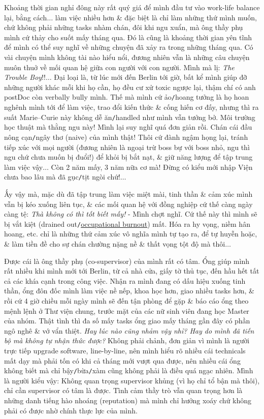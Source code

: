 \documentclass[12pt,oneside]{book}
\begin{document}
Khoảng thời gian nghỉ đông này rất quý giá để mình đầu tư vào work-life balance lại, bằng cách$\ldots$ làm việc nhiều hơn \& đặc biệt là chỉ làm những thứ mình muốn, chứ không phải những tasks nhàm chán, đôi khi ngu xuẩn, mà ông thầy phụ mình cứ thảy cho suốt mấy tháng qua. Đó là cũng là khoảng thời gian yên tĩnh để mình có thể suy nghĩ về những chuyện đã xảy ra trong những tháng qua. Có vài chuyện mình không tài nào hiểu nổi, đương nhiên vẫn là những câu chuyện muôn thuở về mối quan hệ giữa con người với con người. Mình mà lị: {\it The Trouble Boy}!!$\ldots$ Đại loại là, từ lúc mới đến Berlin tới giờ, bất kể mình giúp đỡ những người khác mỗi khi họ cần, họ đều cư xử toxic ngược lại, thậm chí có anh postDoc còn verbally bully mình. Thế mà mình cứ ảo{\tt/}hoang tưởng là họ hoan nghênh mình tới để làm việc, trao đổi kiến thức \& cống hiến cơ đấy, nhưng thì ra suất Marie--Curie này không dễ ăn{\tt/}handled như mình vẫn tưởng bở. Môi trường học thuật mà thằng ngu này! Mình lại suy nghĩ quá đơn giản rồi. Chán cái đầu nông cạn{\tt/}ngây thơ (naive) của mình thật! Thôi cứ đành ngậm họng lại, tránh tiếp xúc với mọi người (đương nhiên là ngoại trừ boss bự với boss nhỏ, ngu thì ngu chứ chưa muốn bị đuổi!) để khỏi bị bắt nạt, \& giữ năng lượng để tập trung làm việc vậy$\ldots$ Còn 2 năm mấy, 3 năm nữa cơ mà! Đừng có kiểu mới nhập Viện chưa bao lâu mà đã gục{\tt/}tịt ngòi chứ!$\ldots$

Ấy vậy mà, mặc dù đã tập trung làm việc miệt mài, tinh thần \& cảm xúc mình vẫn bị kéo xuống liên tục, \& các mối quan hệ với đồng nghiệp cứ thế càng ngày càng tệ: {\it Thà không có thì tốt biết mấy!} - Mình chợt nghĩ. Cứ thế này thì mình sẽ bị vắt kiệt (drained out{\tt/}\href{https://en.wikipedia.org/wiki/Occupational_burnout}{occupational burnout}) mất. Hóa ra hy vọng, niềm hân hoang, etc. chỉ là những thứ cảm xúc vô nghĩa mình tự tạo ra, để tự huyễn hoặc, \& làm tiền đề cho sự chán chường nặng nề \& thất vọng tột độ mà thôi$\ldots$

Được cái là ông thầy phụ (co-supervisor) của mình rất có tâm. Ổng giúp mình rất nhiều khi mình mới tới Berlin, từ cả nhà cửa, giấy tờ thủ tục, đến hầu hết tất cả các khía cạnh trong công việc. Nhận ra mình đang có dấu hiệu xuống tinh thần, ổng đôn đốc mình làm việc nề nếp, khoa học hơn, giao nhiều tasks hơn, \& rồi cứ 4 giờ chiều mỗi ngày mình sẽ đến tận phòng để gặp \& báo cáo ổng theo mệnh lệnh ở Thư viện chung, trước mặt của các nữ sinh viên đang học Master của nhóm. Thật tình thì đa số mấy tasks ổng giao mấy tháng gần đây có phần ngô nghê \& vớ vẩn thiệt. {\it Hay lúc nào cũng nhảm vậy nhỉ? Hay do mình đã tiến bộ mà không tự nhận thức được?} Không phải chảnh, đơn giản vì mình là người trực tiếp upgrade software, line-by-line, nên mình hiểu rõ nhiều cái technicals mất dạy mà phải tốn có khi cả tháng mới vượt qua được, nên nhiều cái ổng không biết mà chỉ bậy{\tt/}bừa{\tt/}xàm cũng không phải là điều quá ngạc nhiên. Mình là người kiểu vậy: Không quan trọng supervisor khủng (vì họ chỉ tổ bận mà thôi), chỉ cần supervisor có tâm là được. Tình cảm thầy trò vẫn quan trọng hơn là những danh tiếng hào nhoáng (reputation) mà mình chỉ hưởng xoáy chứ không phải có được nhờ chính thực lực của mình.
\end{document}
